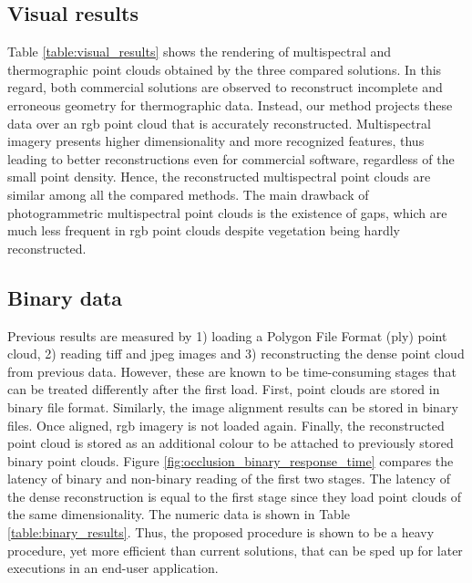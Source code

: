 \subsection{Visual results}

Table \ref{table:visual_results} shows the rendering of multispectral and thermographic point clouds obtained by the three compared solutions. In this regard, both commercial solutions are observed to reconstruct incomplete and erroneous geometry for thermographic data. Instead, our method projects these data over an \acrshort{rgb} point cloud that is accurately reconstructed. Multispectral imagery presents higher dimensionality and more recognized features, thus leading to better reconstructions even for commercial software, regardless of the small point density. Hence, the reconstructed multispectral point clouds are similar among all the compared methods. The main drawback of photogrammetric multispectral point clouds is the existence of gaps, which are much less frequent in \acrshort{rgb} point clouds despite vegetation being hardly reconstructed. 

\subsection{Binary data}

Previous results are measured by 1) loading a Polygon File Format (\acrshort{ply}) point cloud, 2) reading \acrshort{tiff} and \acrshort{jpeg} images and 3) reconstructing the dense point cloud from previous data. However, these are known to be time-consuming stages that can be treated differently after the first load. First, point clouds are stored in binary file format. Similarly, the image alignment results can be stored in binary files. Once aligned, \acrshort{rgb} imagery is not loaded again. Finally, the reconstructed point cloud is stored as an additional colour to be attached to previously stored binary point clouds. Figure \ref{fig:occlusion_binary_response_time} compares the latency of binary and non-binary reading of the first two stages. The latency of the dense reconstruction is equal to the first stage since they load point clouds of the same dimensionality. The numeric data is shown in Table \ref{table:binary_results}. Thus, the proposed procedure is shown to be a heavy procedure, yet more efficient than current solutions, that can be sped up for later executions in an end-user application.

